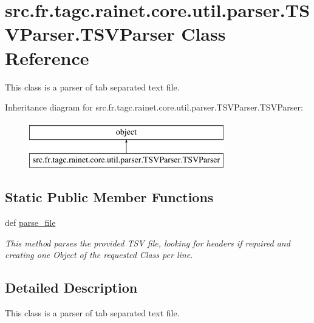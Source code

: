 \hypertarget{classsrc_1_1fr_1_1tagc_1_1rainet_1_1core_1_1util_1_1parser_1_1TSVParser_1_1TSVParser}{\section{src.\-fr.\-tagc.\-rainet.\-core.\-util.\-parser.\-T\-S\-V\-Parser.\-T\-S\-V\-Parser Class Reference}
\label{classsrc_1_1fr_1_1tagc_1_1rainet_1_1core_1_1util_1_1parser_1_1TSVParser_1_1TSVParser}
}


This class is a parser of tab separated text file.  


Inheritance diagram for src.\-fr.\-tagc.\-rainet.\-core.\-util.\-parser.\-T\-S\-V\-Parser.\-T\-S\-V\-Parser\-:\begin{figure}[H]
\begin{center}
\leavevmode
\includegraphics[height=2.000000cm]{classsrc_1_1fr_1_1tagc_1_1rainet_1_1core_1_1util_1_1parser_1_1TSVParser_1_1TSVParser}
\end{center}
\end{figure}
\subsection*{Static Public Member Functions}
\begin{DoxyCompactItemize}
\item 
def \hyperlink{classsrc_1_1fr_1_1tagc_1_1rainet_1_1core_1_1util_1_1parser_1_1TSVParser_1_1TSVParser_adeb6909f980f72ccaf9a8d38a5f7e576}{parse\-\_\-file}
\begin{DoxyCompactList}\small\item\em This method parses the provided T\-S\-V file, looking for headers if required and creating one Object of the requested Class per line. \end{DoxyCompactList}\end{DoxyCompactItemize}


\subsection{Detailed Description}
This class is a parser of tab separated text file. 

